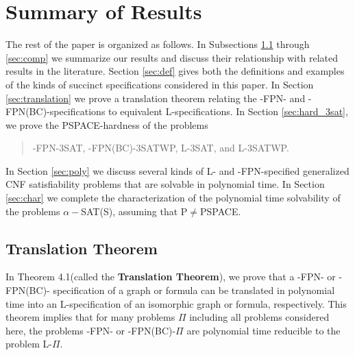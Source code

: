 \section{Summary of Results}
\label{sec:summary}

The rest of the paper is organized as follows.  In Subsections 
\ref{sec:trans} through \ref{sec:comp} 
we summarize our  results and discuss their relationship with related 
results in the literature. Section \ref{sec:def} gives both the 
definitions and examples of the kinds of  succinct 
specifications considered in this paper.
In Section \ref{sec:translation}
we  prove a translation theorem  relating the 
{-FPN-} and {-FPN(BC)-}specifications 
to equivalent {\sf L-}specifications. 
 In Section \ref{sec:hard_3sat},
we prove the {\sf PSPACE}-hardness of the problems
\begin{quote}
 {-FPN-3SAT}, {-FPN(BC)-3SATWP},  {\sf L-3SAT}, and
{\sf L-3SATWP}.
\end{quote}
In Section \ref{sec:poly} we discuss several kinds of  
{\sf L-} and {-FPN-}specified generalized {\sf CNF} 
 satisfiability problems that are solvable in 
polynomial time. In Section \ref{sec:char} 
we complete the characterization of the polynomial time solvability
of the problems $\alpha-${\sf SAT(S)}, assuming that {\sf P}$\neq${\sf PSPACE}. 

 
\subsection{Translation Theorem}\label{sec:trans}

In Theorem 4.1(called the {\bf Translation Theorem}),
we prove that a {-FPN-} or {-FPN(BC)-} specification of a graph
or  formula can be translated in polynomial time into an
{\sf L}-specification of an isomorphic  graph or formula, respectively.
This theorem implies that for many problems
$\Pi$ including all problems considered here,  the problems 
{-FPN-} or {-FPN(BC)-}$\Pi$ are 
polynomial time reducible to  the problem {\sf L-}$\Pi$.

